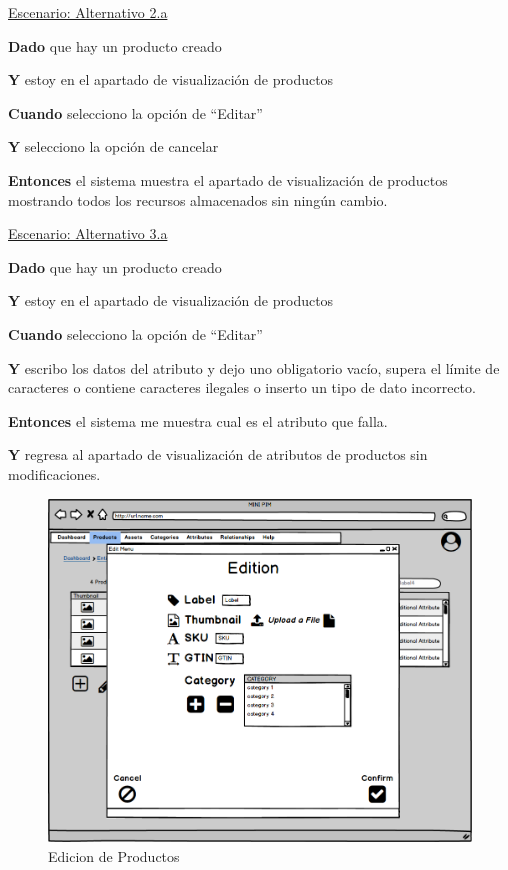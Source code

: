\underline{Escenario: Alternativo 2.a}\par
\vspace{0.15cm}
\textbf{Dado} que hay un producto creado\par
\textbf{Y} estoy en el apartado de visualización de productos\par
\textbf{Cuando} selecciono la opción de “Editar”\par
\textbf{Y} selecciono la opción de cancelar\par
\textbf{Entonces} el sistema muestra el apartado de visualización de productos mostrando todos los recursos almacenados sin ningún cambio.\par
\vspace{0.20cm}

\underline{Escenario: Alternativo 3.a}\par
\vspace{0.15cm}
\textbf{Dado} que hay un producto creado\par
\textbf{Y} estoy en el apartado de visualización de productos\par
\textbf{Cuando} selecciono la opción de “Editar”\par
\textbf{Y} escribo los datos del atributo y dejo uno obligatorio vacío, supera el límite de caracteres o contiene caracteres ilegales o inserto un tipo de dato incorrecto.\par
\textbf{Entonces} el sistema me muestra cual es el atributo que falla.\par
\textbf{Y} regresa al apartado de visualización de atributos de productos sin modificaciones.\par
\vspace{0.20cm}

\begin{figure}[H]
    \includegraphics[width=1\linewidth]{mockups/RF2-X Editar Producto.png}
    \caption{Edicion de Productos}
   \end{figure}
\vspace{1.0cm}

\newpage %